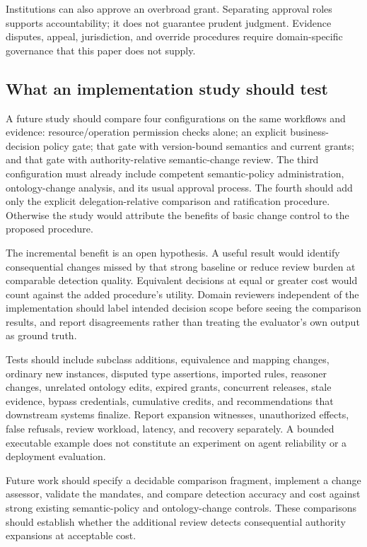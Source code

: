 \documentclass[
  english,
  12pt,
  a4paper,
  preprint,
  numbers,
  nopreprintline]{elsarticle}
\begin{document}
Institutions can also approve an overbroad grant. Separating approval
roles supports accountability; it does not guarantee prudent judgment.
Evidence disputes, appeal, jurisdiction, and override procedures require
domain-specific governance that this paper does not supply.

\subsection{What an implementation study should
test}\label{what-an-implementation-study-should-test}

A future study should compare four configurations on the same workflows
and evidence: resource/operation permission checks alone; an explicit
business-decision policy gate; that gate with version-bound semantics
and current grants; and that gate with authority-relative
semantic-change review. The third configuration must already include
competent semantic-policy administration, ontology-change analysis, and
its usual approval process. The fourth should add only the explicit
delegation-relative comparison and ratification procedure. Otherwise the
study would attribute the benefits of basic change control to the
proposed procedure.

The incremental benefit is an open hypothesis. A useful result would
identify consequential changes missed by that strong baseline or reduce
review burden at comparable detection quality. Equivalent decisions at
equal or greater cost would count against the added procedure's utility.
Domain reviewers independent of the implementation should label intended
decision scope before seeing the comparison results, and report
disagreements rather than treating the evaluator's own output as ground
truth.

Tests should include subclass additions, equivalence and mapping
changes, ordinary new instances, disputed type assertions, imported
rules, reasoner changes, unrelated ontology edits, expired grants,
concurrent releases, stale evidence, bypass credentials, cumulative
credits, and recommendations that downstream systems finalize. Report
expansion witnesses, unauthorized effects, false refusals, review
workload, latency, and recovery separately. A bounded executable example
does not constitute an experiment on agent reliability or a deployment
evaluation.

Future work should specify a decidable comparison fragment, implement a
change assessor, validate the mandates, and compare detection accuracy
and cost against strong existing semantic-policy and ontology-change
controls. These comparisons should establish whether the additional
review detects consequential authority expansions at acceptable cost.
\end{document}
